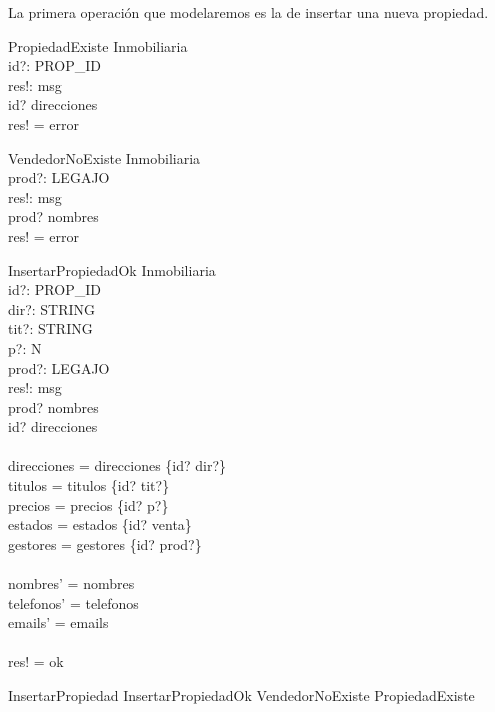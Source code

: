 \documentclass[12pt]{article}
\begin{document}
La primera operación que modelaremos es la de insertar una nueva propiedad.

\begin{schema}{PropiedadExiste}
\Xi Inmobiliaria \\
id?: PROP\_ID \\
res!: msg \\
\where
id? \in \dom direcciones \\
res! = error \\
\end{schema}

\begin{schema}{VendedorNoExiste}
\Xi Inmobiliaria \\
prod?: LEGAJO \\
res!: msg \\
\where
prod? \notin \dom nombres \\
res! = error \\
\end{schema}

\begin{schema}{InsertarPropiedadOk}
\Delta Inmobiliaria \\
id?: PROP\_ID \\
dir?: STRING \\
tit?: STRING \\
p?: N \\
prod?: LEGAJO \\
res!: msg \\
\where
prod? \in \dom nombres \\
id? \notin \dom direcciones \\
\ \\
direcciones =  direcciones \cup \{id? \mapsto dir?\}  \\
titulos = titulos \cup \{id? \mapsto tit?\}  \\
precios = precios \cup \{id? \mapsto p?\}  \\
estados = estados \cup \{id? \mapsto venta\}  \\
gestores = gestores \cup \{id? \mapsto prod?\}  \\
\ \\
nombres' =  nombres  \\
telefonos' =  telefonos  \\
emails' =  emails  \\
\ \\
res! = ok \\
\end{schema}

\begin{zed}
InsertarPropiedad  InsertarPropiedadOk \lor VendedorNoExiste \lor PropiedadExiste
\end{zed}
\end{document}
